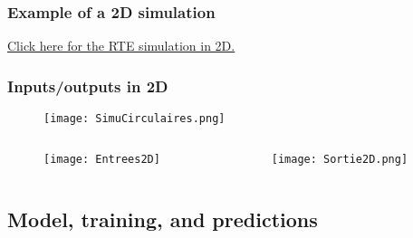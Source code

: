 \begin{frame}[fragile]
  \frametitle{Example of a 2D simulation}
  
  \begin{center}
    \textcolor{violet}{\href{run:../img/Video2D.mp4}{Click here for the RTE simulation in 2D.}}
  \end{center}


\end{frame}

\begin{frame}[fragile]
  \frametitle{Inputs/outputs in 2D}

      \begin{figure}
      \texttt{[image: SimuCirculaires.png]}       
      \end{figure}

      \begin{columns}
        \begin{column}{0.5\textwidth}
          \begin{figure}
            \texttt{[image: Entrees2D]}       
            \end{figure}
        \end{column}
        \begin{column}{0.5\textwidth}
          \begin{figure}
            \texttt{[image: Sortie2D.png]}       
            \end{figure}
        \end{column}
      \end{columns}


\end{frame}



\subsection{Model, training, and predictions}


